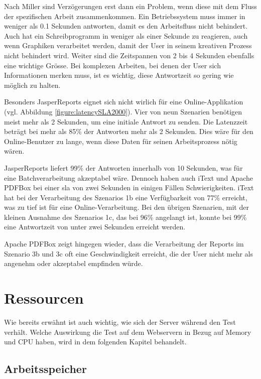 \documentclass[main.tex]{subfiles}
\begin{document}
Nach Miller \cite[Seite~270]{miller_1968} sind Verzögerungen erst dann ein Problem, wenn diese mit dem Fluss der spezifischen Arbeit zusammenkommen. Ein Betriebssystem muss immer in weniger als 0.1 Sekunden antworten, damit es den Arbeitsfluss nicht behindert. Auch hat ein Schreibprogramm in weniger als einer Sekunde zu reagieren, auch wenn Graphiken verarbeitet werden, damit der User in seinem kreativen Prozess nicht behindert wird. Weiter sind die Zeitspannen von 2 bis 4 Sekunden ebenfalls eine wichtige Grösse. Bei komplexen Arbeiten, bei denen der User sich Informationen merken muss, ist es wichtig, diese Antwortzeit so gering wie möglich zu halten.

Besonders JasperReports eignet sich nicht wirlich für eine Online-Applikation (vgl. Abbildung \ref{figure:latencySLA2000}). Vier von neun Szenarien benötigen meist mehr als 2 Sekunden, um eine initiale Antwort zu senden. Die Latenzzeit beträgt bei mehr als 85\% der Antworten mehr als 2 Sekunden. Dies wäre für den Online-Benutzer zu lange, wenn diese Daten für seinen Arbeitsprozess nötig wären.

JasperReports liefert 99\% der Antworten innerhalb von 10 Sekunden, was für eine Batchverarbeitung akzeptabel wäre. Dennoch haben auch iText und Apache PDFBox bei einer \acrshort{sla} von zwei Sekunden in einigen Fällen Schwierigkeiten. iText hat bei der Verarbeitung des Szenarios 1b eine Verfügbarkeit von 77\% erreicht, was zu tief ist für eine Online-Verarbeitung. Bei den übrigen Szenarien, mit der kleinen Ausnahme des Szenarios 1c, das bei 96\% angelangt ist, konnte bei 99\% eine Antwortzeit von unter zwei Sekunden erreicht werden.

Apache PDFBox zeigt hingegen wieder, dass die Verarbeitung der Reports im Szenario 3b und 3c oft eine Geschwindigkeit erreicht, die der User nicht mehr als angenehm oder akzeptabel empfinden würde.








\section{Ressourcen}
Wie bereits erwähnt ist auch wichtig, wie sich der Server während den Test verhält.
Welche Auswirkung die Test auf dem Webservern in Bezug auf Memory und CPU haben, wird in dem folgenden Kapitel behandelt. 

\subsection{Arbeitsspeicher}
\end{document}
